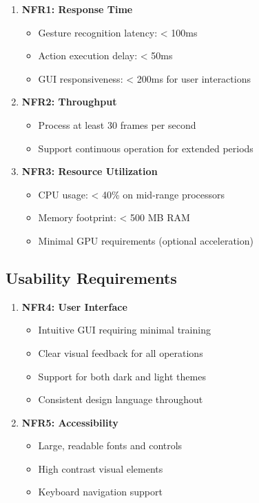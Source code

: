 \documentclass[12pt,a4paper]{report}
\begin{document}
\begin{enumerate}
    \item \textbf{NFR1: Response Time}
    \begin{itemize}
        \item Gesture recognition latency: < 100ms
        \item Action execution delay: < 50ms
        \item GUI responsiveness: < 200ms for user interactions
    \end{itemize}
    
    \item \textbf{NFR2: Throughput}
    \begin{itemize}
        \item Process at least 30 frames per second
        \item Support continuous operation for extended periods
    \end{itemize}
    
    \item \textbf{NFR3: Resource Utilization}
    \begin{itemize}
        \item CPU usage: < 40\% on mid-range processors
        \item Memory footprint: < 500 MB RAM
        \item Minimal GPU requirements (optional acceleration)
    \end{itemize}
\end{enumerate}

\subsection{Usability Requirements}

\begin{enumerate}
    \item \textbf{NFR4: User Interface}
    \begin{itemize}
        \item Intuitive GUI requiring minimal training
        \item Clear visual feedback for all operations
        \item Support for both dark and light themes
        \item Consistent design language throughout
    \end{itemize}
    
    \item \textbf{NFR5: Accessibility}
    \begin{itemize}
        \item Large, readable fonts and controls
        \item High contrast visual elements
        \item Keyboard navigation support
    \end{itemize}
\end{enumerate}
\end{document}
